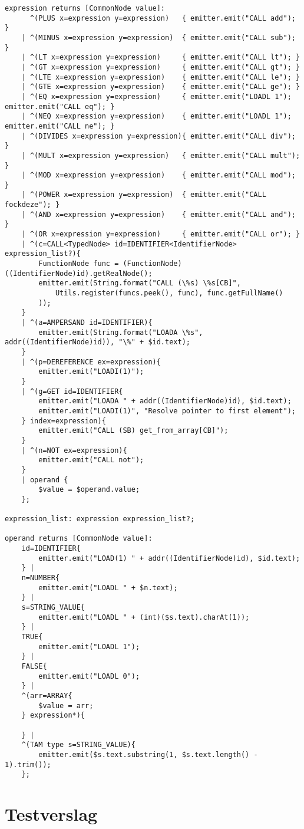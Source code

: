 \begin{landscape}
\begin{lstlisting}
expression returns [CommonNode value]:
      ^(PLUS x=expression y=expression)   { emitter.emit("CALL add"); }
    | ^(MINUS x=expression y=expression)  { emitter.emit("CALL sub"); }
    | ^(LT x=expression y=expression)     { emitter.emit("CALL lt"); }
    | ^(GT x=expression y=expression)     { emitter.emit("CALL gt"); }
    | ^(LTE x=expression y=expression)    { emitter.emit("CALL le"); }
    | ^(GTE x=expression y=expression)    { emitter.emit("CALL ge"); }
    | ^(EQ x=expression y=expression)     { emitter.emit("LOADL 1"); emitter.emit("CALL eq"); }
    | ^(NEQ x=expression y=expression)    { emitter.emit("LOADL 1"); emitter.emit("CALL ne"); }
    | ^(DIVIDES x=expression y=expression){ emitter.emit("CALL div"); }
    | ^(MULT x=expression y=expression)   { emitter.emit("CALL mult"); }
    | ^(MOD x=expression y=expression)    { emitter.emit("CALL mod"); }
    | ^(POWER x=expression y=expression)  { emitter.emit("CALL fockdeze"); }
    | ^(AND x=expression y=expression)    { emitter.emit("CALL and"); }
    | ^(OR x=expression y=expression)     { emitter.emit("CALL or"); }
    | ^(c=CALL<TypedNode> id=IDENTIFIER<IdentifierNode> expression_list?){
        FunctionNode func = (FunctionNode)((IdentifierNode)id).getRealNode();
        emitter.emit(String.format("CALL (\%s) \%s[CB]",
            Utils.register(funcs.peek(), func), func.getFullName()
        ));
    }
    | ^(a=AMPERSAND id=IDENTIFIER){
        emitter.emit(String.format("LOADA \%s", addr((IdentifierNode)id)), "\%" + $id.text);
    }
    | ^(p=DEREFERENCE ex=expression){
        emitter.emit("LOADI(1)");
    }
    | ^(g=GET id=IDENTIFIER{
        emitter.emit("LOADA " + addr((IdentifierNode)id), $id.text);
        emitter.emit("LOADI(1)", "Resolve pointer to first element");
    } index=expression){
        emitter.emit("CALL (SB) get_from_array[CB]");
    }
    | ^(n=NOT ex=expression){
        emitter.emit("CALL not");
    }
    | operand {
        $value = $operand.value;
    };

expression_list: expression expression_list?;

operand returns [CommonNode value]:
    id=IDENTIFIER{
        emitter.emit("LOAD(1) " + addr((IdentifierNode)id), $id.text);
    } |
    n=NUMBER{
        emitter.emit("LOADL " + $n.text);
    } |
    s=STRING_VALUE{
        emitter.emit("LOADL " + (int)($s.text).charAt(1));
    } |
    TRUE{
        emitter.emit("LOADL 1");
    } |
    FALSE{
        emitter.emit("LOADL 0");
    } |
    ^(arr=ARRAY{
        $value = arr;
    } expression*){

    } |
    ^(TAM type s=STRING_VALUE){
        emitter.emit($s.text.substring(1, $s.text.length() - 1).trim());
    };
\end{lstlisting}

\clearpage

\section{Testverslag} %
\label{sec:testverslag}


\end{landscape}
